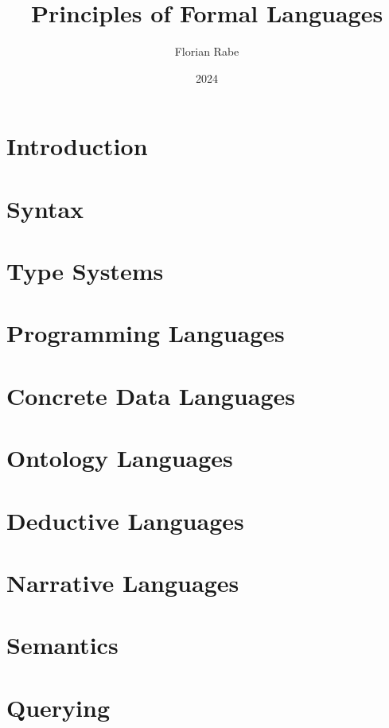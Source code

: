 \documentclass{beamer}
\begin{document}
\title{Principles of Formal Languages}
\author{Florian Rabe}
\date{2024}
\begin{frame}
    \titlepage
\end{frame}

\part{Introduction}


\part{Syntax}


\part{Type Systems}


\part{Programming Languages}


\part{Concrete Data Languages}


\part{Ontology Languages}


\part{Deductive Languages}


\part{Narrative Languages}


\part{Semantics}


\part{Querying}

\end{document}
